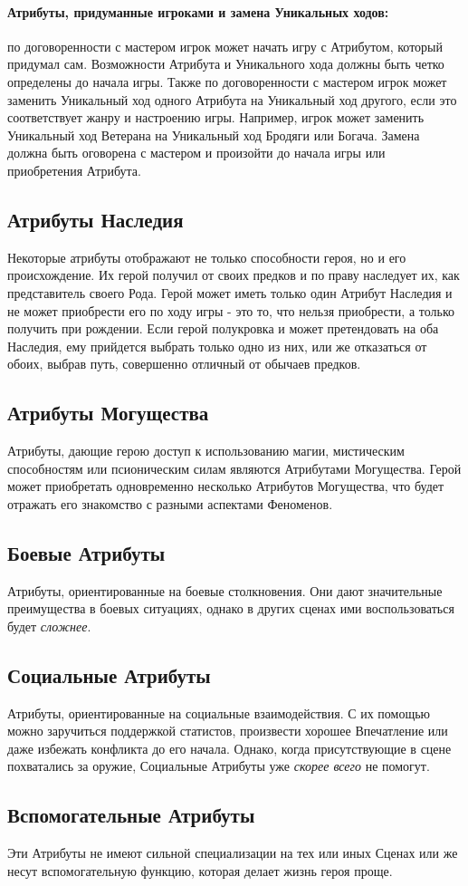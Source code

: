 \paragraph{Атрибуты, придуманные игроками и замена Уникальных ходов:} по договоренности с мастером игрок может начать игру с Атрибутом, который придумал сам. Возможности Атрибута и Уникального хода должны быть четко определены до начала игры. Также по договоренности с мастером игрок может заменить Уникальный ход одного Атрибута на Уникальный ход другого, если это соответствует жанру и настроению игры. Например, игрок может заменить Уникальный ход Ветерана на Уникальный ход Бродяги или Богача. Замена должна быть оговорена с мастером и произойти до начала игры или приобретения Атрибута.

\subsection{Атрибуты Наследия}
Некоторые атрибуты отображают не только способности героя, но и его происхождение. Их герой получил от своих предков и по праву наследует их, как представитель своего Рода. Герой может иметь только один Атрибут Наследия и не может приобрести его по ходу игры - это то, что нельзя приобрести, а только получить при рождении. Если герой полукровка и может претендовать на оба Наследия, ему прийдется выбрать только одно из них, или же отказаться от обоих, выбрав путь, совершенно отличный от обычаев предков.

\subsection{Атрибуты Могущества}
Атрибуты, дающие герою доступ к использованию магии, мистическим способностям или псионическим силам являются Атрибутами Могущества. Герой может приобретать одновременно несколько Атрибутов Могущества, что будет отражать его знакомство с разными аспектами Феноменов.

\subsection{Боевые Атрибуты}
Атрибуты, ориентированные на боевые столкновения. Они дают значительные преимущества в боевых ситуациях, однако в других сценах ими воспользоваться будет \textit{сложнее}.

\subsection{Социальные Атрибуты}
Атрибуты, ориентированные на социальные взаимодействия. С их помощью можно заручиться поддержкой статистов, произвести хорошее Впечатление или даже избежать конфликта до его начала. Однако, когда присутствующие в сцене похватались за оружие, Социальные Атрибуты уже \textit{скорее всего} не помогут.

\subsection{Вспомогательные Атрибуты}
Эти Атрибуты не имеют сильной специализации на тех или иных Сценах или же несут вспомогательную функцию, которая делает жизнь героя проще.

\printindex[attributes]

